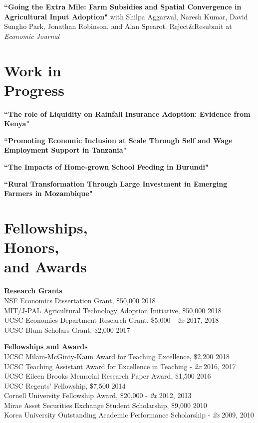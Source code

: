 \documentclass[letterpaper, margin, 10pt]{res} %
\begin{document}
\begin{resume}
{\bf ``Going the Extra Mile: Farm Subsidies and Spatial Convergence in Agricultural Input Adoption"}
with Shilpa Aggarwal, Naresh Kumar, David Sungho Park, Jonathan Robinson, and Alan Spearot. Reject\&Resubmit at \textit{Economic Journal}


\normalsize\section{\textbf{Work in  \\ Progress}}

{\bf ``The role of Liquidity on Rainfall Insurance Adoption: Evidence from Kenya"}

{\bf ``Promoting Economic Inclusion at Scale Through Self and Wage Employment Support in Tanzania"}

{\bf ``The Impacts of Home-grown School Feeding in Burundi"}

{\bf ``Rural Transformation Through Large Investment in Emerging Farmers in Mozambique"}



\section{\sc \textbf{Fellowships, \\ Honors, \\ and Awards}}
{\bf Research Grants}\\
NSF Economics Dissertation Grant, \$50,000  \hfill{2018}\\
MIT/J-PAL Agricultural Technology Adoption Initiative, \$50,000   \hfill{2018}\\
UCSC Economics Department Research Grant, \$5,000 - \textit{2x}  \hfill{2017, 2018}\\
UCSC Blum Scholars Grant, \$2,000    \hfill{2017}

{\bf Fellowships and Awards}\\
UCSC Milam-McGinty-Kaun Award for Teaching Excellence, \$2,200  \hfill{2018}\\
UCSC Teaching Assistant Award for Excellence in Teaching -  \textit{2x}   \hfill{2016, 2017}\\
UCSC Eileen Brooks Memorial Research Paper Award, \$1,500  \hfill{2016}\\
UCSC Regents' Fellowship, \$7,500 \hfill{2014}\\
Cornell University Fellowship Award, \$20,000 -  \textit{2x} \hfill{2012, 2013}\\
Mirae Asset Securities Exchange Student Scholarship, \$9,000 \hfill{2010}\\
Korea University Outstanding Academic Performance Scholarship -  \textit{2x} \hfill{2009, 2010}



\end{resume}
\end{document}
